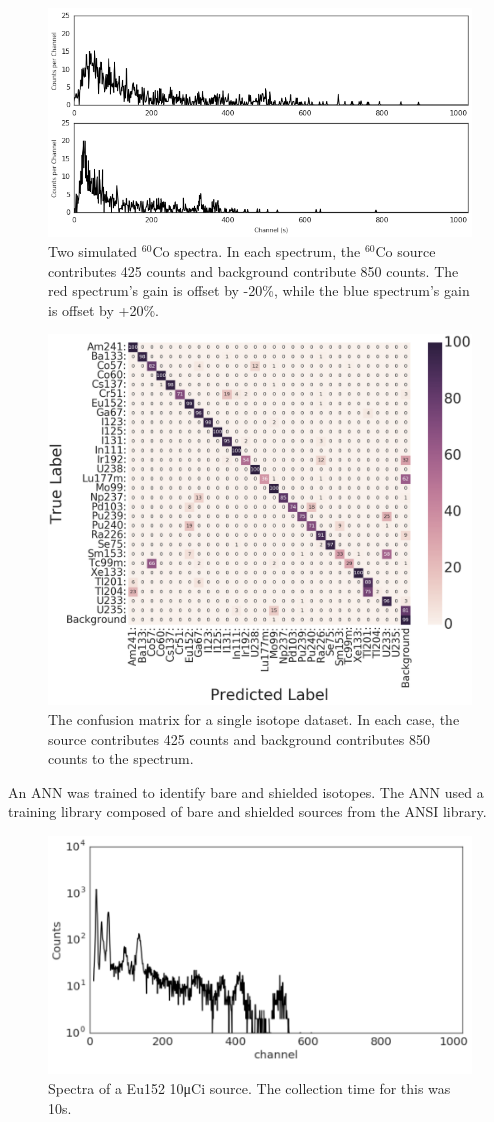 \documentclass[tocnosub,noragright,centerchapter,12pt,fullpage]{uiucecethesis09}
\begin{document}
\begin{figure}[H]
\centering
\includegraphics[width=0.75\linewidth]{images/Co60_both_10s}
\caption{Two simulated $^{60}$Co spectra. In each spectrum, the $^{60}$Co source contributes 425 counts and background contribute 850 counts. The red spectrum's gain is offset by -20\%, while the blue spectrum's gain is offset by +20\%.}
\label{fig:co60_diff_pmt_10s}
\end{figure}



\begin{figure}[H]
\centering
\includegraphics[width=0.7\linewidth]{images/conf_matrix_10s}
\caption{The confusion matrix for a single isotope dataset. In each case, the source contributes 425 counts and background contributes 850 counts to the spectrum.}
\label{fig:conf_matrix_10s}
\end{figure}


An ANN was trained to identify bare and shielded isotopes. The ANN used a training library composed of bare and shielded sources from the ANSI library. 

\begin{figure}[H]
\centering
\includegraphics[width=0.75\linewidth]{images/Bare_Eu152}
\caption{Spectra of a Eu152 10μCi source. The collection time for this was 10s.}
\label{fig:Bare_Eu152}
\end{figure}
\end{document}
